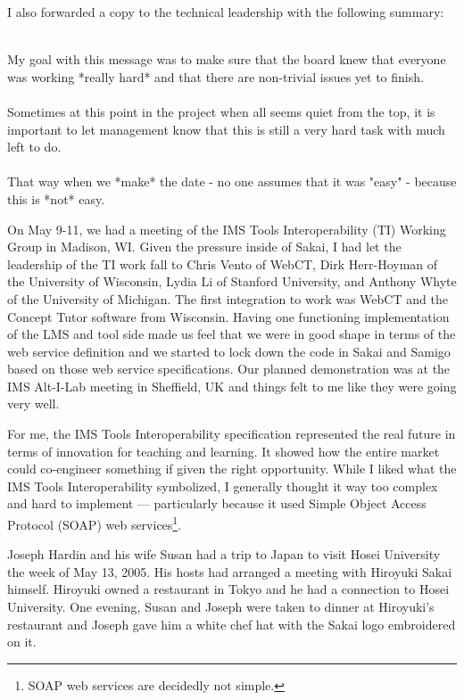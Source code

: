 \documentclass[12pt]{book}
\begin{document}
I also forwarded a copy to the technical leadership
with the following summary:\\
\\
\begin{sf}
My goal with this message was to make sure that the
board knew that everyone was working *really hard*
and that there are non-trivial issues yet to finish.\\
\\
Sometimes at this point in the project when all
seems quiet from the top, it is important to let
management know that this is still a very hard task
with much left to do.\\
\\
That way when we *make* the date - no one assumes that
it was "easy" - because this is *not* easy.\\
\end{sf}

On May 9-11, we had a meeting of the IMS Tools Interoperability (TI)
Working Group in Madison, WI.  Given the pressure inside
of Sakai, I had let the leadership of the TI work
fall to Chris Vento of WebCT, Dirk Herr-Hoyman of the University of Wisconsin,
Lydia Li of Stanford University, and Anthony Whyte of the University
of Michigan.
The first integration to work was WebCT and the
Concept Tutor software from Wisconsin.   Having one
functioning implementation of the LMS and tool side made us
feel that we were in good shape in terms of the web service
definition and we started to lock down the code in Sakai
and Samigo based on those web service specifications.
Our planned demonstration was at the IMS Alt-I-Lab meeting
in Sheffield, UK and things felt to me like they
were going very well.

For me, the IMS Tools Interoperability specification
represented the real future in terms of innovation
for teaching and learning.  It showed how the entire market
could co-engineer something if given the right opportunity.
While I liked what the IMS Tools Interoperability symbolized,
I generally thought it way too complex and hard to
implement --- particularly because it used 
Simple Object Access Protocol
(SOAP) web services\footnote{SOAP web services are decidedly 
not simple.}.

Joseph Hardin and his wife Susan had a trip to Japan to visit
Hosei University the week of May 13, 2005.  His hosts had
arranged a meeting with Hiroyuki Sakai himself.  Hiroyuki
owned a restaurant in Tokyo and he had a connection to Hosei
University.   One evening, Susan and Joseph were taken to dinner
at Hiroyuki's restaurant and Joseph gave him a white chef hat
with the Sakai logo embroidered on it.
\end{document}
